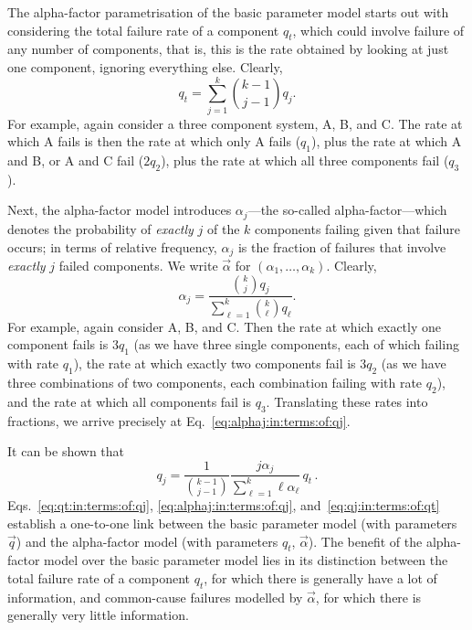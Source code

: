 The alpha-factor parametrisation of the basic parameter model
\parencite{1988:mosleh::common:cause} starts out with
considering the total failure rate of a component $q_t$,
which could involve failure of any number of components,
that is, this is the rate obtained by looking at just one component,
ignoring everything else.
Clearly,
\begin{equation}\label{eq:qt:in:terms:of:qj}
  q_t=\sum_{j=1}^k\binom{k-1}{j-1}q_j.
\end{equation}
For example, again consider a three component system, A, B, and C.
The rate at which A fails is then
the rate at which only A fails ($q_1$),
plus the rate at which A and B, or A and C fail ($2q_2$),
plus the rate at which all three components fail ($q_3$).

Next, the alpha-factor model introduces
$\alpha_j$---the so-called alpha-factor---which
denotes the probability of \emph{exactly} $j$ of the $k$ components
failing given that failure occurs;
in terms of relative frequency,
$\alpha_j$ is the fraction of failures
that involve \emph{exactly} $j$ failed components.
We write $\vec{\alpha}$ for $(\alpha_1,\dots,\alpha_k)$.
Clearly,
\begin{equation}\label{eq:alphaj:in:terms:of:qj}
  \alpha_j=\frac{\binom{k}{j}q_j}{\sum_{\ell=1}^k\binom{k}{\ell}q_\ell}.
\end{equation}
For example, again consider A, B, and C.
Then the rate at which exactly one component fails is $3q_1$
(as we have three single components, each of which failing with rate $q_1$),
the rate at which exactly two components fail is $3q_2$
(as we have three combinations of two components,
each combination failing with rate $q_2$),
and the rate at which all components fail is $q_3$.
Translating these rates into fractions,
we arrive precisely at Eq.~\eqref{eq:alphaj:in:terms:of:qj}.

It can be shown that \parencite[p.~C-10f]{1988:mosleh::common:cause} %
\begin{equation}\label{eq:qj:in:terms:of:qt}
  q_j=\frac{1}{\binom{k-1}{j-1}}\frac{j\alpha_j}{\sum_{\ell=1}^k \ell\alpha_\ell}\,q_t\,.
\end{equation}
Eqs.~\eqref{eq:qt:in:terms:of:qj}, \eqref{eq:alphaj:in:terms:of:qj},
and~\eqref{eq:qj:in:terms:of:qt}
establish a one-to-one link between the basic parameter model (with parameters $\vec{q}$)
and the alpha-factor model (with parameters $q_t$, $\vec{\alpha}$).
The benefit of the alpha-factor model over the basic parameter model
lies in its distinction between the total failure rate of a component $q_t$,
for which there is generally have a lot of information,
and common-cause failures modelled by $\vec{\alpha}$,
for which there is generally very little information.

